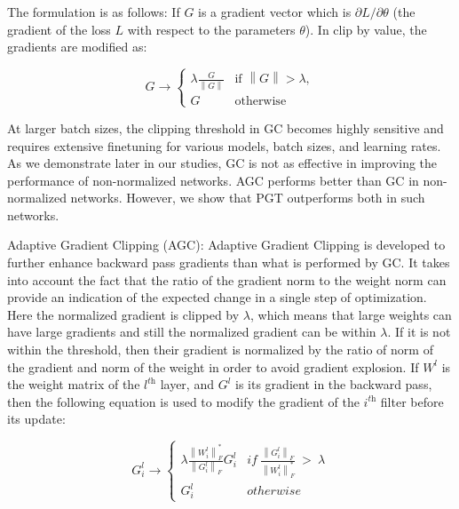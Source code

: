 \documentclass[times,sort&compress]{elsarticle}
\newcommand{\norm}[1]{\left\lVert#1\right\rVert}
\begin{document}
The formulation is as follows: If $G$ is a gradient vector which is $\partial L /
\partial \theta$ (the gradient of the loss $L$ with respect to the parameters $\theta$).
In clip by value, the gradients are modified as:



\begin{equation}
G \rightarrow
\begin{cases}
\lambda \frac{G}{\norm{G}} & \text{if } \norm{G} > \lambda, \\
G & \text{otherwise}
\end{cases}
\end{equation}



At larger batch sizes, the clipping threshold in GC becomes highly sensitive and
requires extensive finetuning for various models, batch sizes, and learning rates. As we
demonstrate later in our studies, GC is not as effective in improving the performance of
non-normalized networks. AGC performs better than GC in non-normalized networks.
However, we show that PGT outperforms both in such networks.




Adaptive Gradient Clipping (AGC): Adaptive Gradient Clipping \cite{brock2021high} is
developed to further enhance backward pass gradients than what is performed by GC. It
takes into account the fact that the ratio of the gradient norm to the weight norm can
provide an indication of the expected change in a single step of optimization. Here the
normalized gradient is clipped by $\lambda$, which means that large weights can have
large gradients and still the normalized gradient can be within $\lambda$. If it is not
within the threshold, then their gradient is normalized by the ratio of norm of the
gradient and norm of the weight in order to avoid gradient explosion. If $W^l$ is the
weight matrix of the $l^\textit{th}$ layer, and $G^l$ is its gradient in the backward
pass, then the following equation is used to modify the gradient of the $i^\textit{th}$
filter before its update:

\begin{equation}
G_{i}^{l}\rightarrow
\begin{cases}
\lambda \frac{\norm{W_{i}^{l} }_{F}^{*}}{\norm{G_{i}^{l} }_{F}} G_{i}^{l} & if\ \frac{\norm{G_{i}^{l} }_{F}}{\norm{W_{i}^{l} }_{F}^{*}} \  >\ \lambda \\
G_{i}^{l} & otherwise
\end{cases}
\end{equation}
\end{document}
